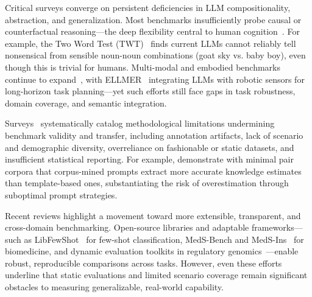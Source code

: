 \documentclass[sigconf]{acmart}
\begin{document}
Critical surveys converge on persistent deficiencies in LLM compositionality, abstraction, and generalization. Most benchmarks insufficiently probe causal or counterfactual reasoning---the deep flexibility central to human cognition~\cite{ref92, ref94, ref96, ref97, ref98, ref99}. For example, the Two Word Test (TWT)~\cite{ref96} finds current LLMs cannot reliably tell nonsensical from sensible noun-noun combinations (goat sky vs. baby boy), even though this is trivial for humans. Multi-modal and embodied benchmarks continue to expand~\cite{ref92, ref94, ref95, ref37}, with ELLMER~\cite{ref37} integrating LLMs with robotic sensors for long-horizon task planning---yet such efforts still face gaps in task robustness, domain coverage, and semantic integration.

Surveys~\cite{ref5, ref10, ref12, ref22, ref55, ref61, ref62, ref63, ref64, ref94} systematically catalog methodological limitations undermining benchmark validity and transfer, including annotation artifacts, lack of scenario and demographic diversity, overreliance on fashionable or static datasets, and insufficient statistical reporting. For example, \cite{ref98} demonstrate with minimal pair corpora that corpus-mined prompts extract more accurate knowledge estimates than template-based ones, substantiating the risk of overestimation through suboptimal prompt strategies.

Recent reviews highlight a movement toward more extensible, transparent, and cross-domain benchmarking. Open-source libraries and adaptable frameworks---such as LibFewShot~\cite{ref64} for few-shot classification, MedS-Bench and MedS-Ins~\cite{ref95} for biomedicine, and dynamic evaluation toolkits in regulatory genomics~\cite{ref63}---enable robust, reproducible comparisons across tasks. However, even these efforts underline that static evaluations and limited scenario coverage remain significant obstacles to measuring generalizable, real-world capability.
\end{document}

